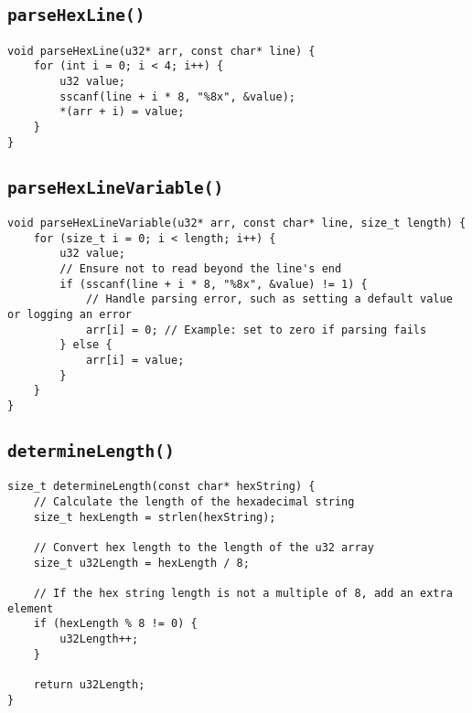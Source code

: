 \subsection{\texttt{parseHexLine()}}
\begin{lstlisting}[style=C]
void parseHexLine(u32* arr, const char* line) {
	for (int i = 0; i < 4; i++) {
		u32 value;
		sscanf(line + i * 8, "%8x", &value);
		*(arr + i) = value;
	}
}
\end{lstlisting}
\subsection{\texttt{parseHexLineVariable()}}
\begin{lstlisting}[style=C]
void parseHexLineVariable(u32* arr, const char* line, size_t length) {
	for (size_t i = 0; i < length; i++) {
		u32 value;
		// Ensure not to read beyond the line's end
		if (sscanf(line + i * 8, "%8x", &value) != 1) {
			// Handle parsing error, such as setting a default value or logging an error
			arr[i] = 0; // Example: set to zero if parsing fails
		} else {
			arr[i] = value;
		}
	}
}
\end{lstlisting}

\newpage
\subsection{\texttt{determineLength()}}
\begin{lstlisting}[style=C]
size_t determineLength(const char* hexString) {
	// Calculate the length of the hexadecimal string
	size_t hexLength = strlen(hexString);
	
	// Convert hex length to the length of the u32 array
	size_t u32Length = hexLength / 8;
	
	// If the hex string length is not a multiple of 8, add an extra element
	if (hexLength % 8 != 0) {
		u32Length++;
	}
	
	return u32Length;
}
\end{lstlisting}

\newpage
